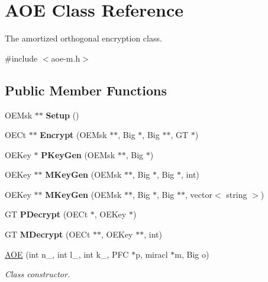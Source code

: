 \hypertarget{classAOE}{}\section{A\+OE Class Reference}
\label{classAOE}


The amortized orthogonal encryption class.  




{\ttfamily \#include $<$aoe-\/m.\+h$>$}

\subsection*{Public Member Functions}
\begin{DoxyCompactItemize}
\item 
O\+E\+Msk $\ast$$\ast$ {\bfseries Setup} ()\hypertarget{classAOE_a5541942137f6423708d83a538433f4f1}{}\label{classAOE_a5541942137f6423708d83a538433f4f1}

\item 
O\+E\+Ct $\ast$$\ast$ {\bfseries Encrypt} (O\+E\+Msk $\ast$$\ast$, Big $\ast$, Big $\ast$$\ast$, GT $\ast$)\hypertarget{classAOE_a82e280b24bb32b82ea2a720807b46a2f}{}\label{classAOE_a82e280b24bb32b82ea2a720807b46a2f}

\item 
O\+E\+Key $\ast$ {\bfseries P\+Key\+Gen} (O\+E\+Msk $\ast$$\ast$, Big $\ast$)\hypertarget{classAOE_a906b3446aeb222ae736e0b3f3713bbc5}{}\label{classAOE_a906b3446aeb222ae736e0b3f3713bbc5}

\item 
O\+E\+Key $\ast$$\ast$ {\bfseries M\+Key\+Gen} (O\+E\+Msk $\ast$$\ast$, Big $\ast$, Big $\ast$, int)\hypertarget{classAOE_a51e0488fcfb885ff9e896beb1c9cc6ac}{}\label{classAOE_a51e0488fcfb885ff9e896beb1c9cc6ac}

\item 
O\+E\+Key $\ast$$\ast$ {\bfseries M\+Key\+Gen} (O\+E\+Msk $\ast$$\ast$, Big $\ast$, Big $\ast$$\ast$, vector$<$ string $>$)\hypertarget{classAOE_acccc5c46c33a8c835604ed9a0be30115}{}\label{classAOE_acccc5c46c33a8c835604ed9a0be30115}

\item 
GT {\bfseries P\+Decrypt} (O\+E\+Ct $\ast$, O\+E\+Key $\ast$)\hypertarget{classAOE_a616c7b95e29156c8f2b6ecdd962d4a86}{}\label{classAOE_a616c7b95e29156c8f2b6ecdd962d4a86}

\item 
GT {\bfseries M\+Decrypt} (O\+E\+Ct $\ast$$\ast$, O\+E\+Key $\ast$$\ast$, int)\hypertarget{classAOE_a2734fc4f2fa9aeef2d36c85a27528842}{}\label{classAOE_a2734fc4f2fa9aeef2d36c85a27528842}

\item 
\hyperlink{classAOE_a6950dbd129bb9eb6ff919004d4482141}{A\+OE} (int n\+\_\+, int l\+\_\+, int k\+\_\+, P\+FC $\ast$p, miracl $\ast$m, Big o)
\begin{DoxyCompactList}\small\item\em Class constructor. \end{DoxyCompactList}\end{DoxyCompactItemize}
